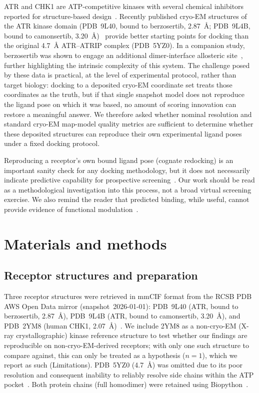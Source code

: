 \documentclass[global,twocolumn]{svjour}
\begin{document}
ATR and CHK1 are ATP-competitive kinases with several chemical inhibitors
reported for structure-based
design~\cite{kumagai2006,bass2016,saldivar2017,casper2002,debatisse2012,fokas2012}.
Recently published cryo-EM structures of the ATR kinase domain (PDB~9L40,
bound to berzosertib, 2.87~\AA{}; PDB~9L4B, bound to camonsertib,
3.20~\AA{})~\cite{wang2025} provide better starting points for docking than
the original 4.7~\AA{} ATR--ATRIP complex (PDB~5YZ0). In a companion study,
berzosertib was shown to engage an additional dimer-interface allosteric
site~\cite{wang2025}, further highlighting the intrinsic complexity of this
system. The challenge posed by these data is practical, at the level of
experimental protocol, rather than target biology: docking to a deposited
cryo-EM coordinate set treats those coordinates as the truth, but if that
single snapshot model does not reproduce the ligand pose on which it was
based, no amount of scoring innovation can restore a meaningful answer. We
therefore asked whether nominal resolution and standard cryo-EM map-model
quality metrics are sufficient to determine whether these deposited
structures can reproduce their own experimental ligand poses under a fixed
docking protocol.

Reproducing a receptor's own bound ligand pose (cognate redocking) is an
important sanity check for any docking methodology, but it does not
necessarily indicate predictive capability for prospective
screening~\cite{jain2008}. Our work should be read as a methodological
investigation into this process, not a broad virtual screening exercise. We
also remind the reader that predicted binding, while useful, cannot provide
evidence of functional modulation~\cite{kumagai2006,bass2016}.

\section{Materials and methods}
\label{sec:methods}

\subsection{Receptor structures and preparation}

Three receptor structures were retrieved in mmCIF format from the RCSB PDB
AWS Open Data mirror (snapshot~2026-01-01): PDB~9L40 (ATR, bound to
berzosertib, 2.87~\AA{}), PDB~9L4B (ATR, bound to camonsertib, 3.20~\AA{}),
and PDB~2YM8 (human CHK1, 2.07~\AA{})~\cite{wang2025}. We include 2YM8 as a
non-cryo-EM (X-ray crystallographic) kinase reference structure to test
whether our findings are reproducible on non-cryo-EM-derived receptors;
with only one such structure to compare against, this can only be treated
as a hypothesis ($n=1$), which we report as such (Limitations). PDB~5YZ0
(4.7~\AA{}) was omitted due to its poor resolution and consequent inability
to reliably resolve side chains within the ATP pocket~\cite{wang2025}. Both
protein chains (full homodimer) were retained using Biopython~\cite{cock2009}.
\end{document}

